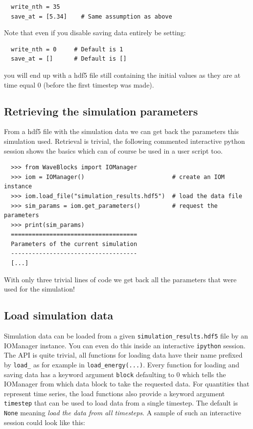 \documentclass[a4paper,10pt]{report}
\begin{document}
\begin{verbatim}
  write_nth = 35
  save_at = [5.34]    # Same assumption as above
\end{verbatim}

Note that even if you disable saving data entirely be setting:

\begin{verbatim}
  write_nth = 0     # Default is 1
  save_at = []      # Default is []
\end{verbatim}

you will end up with a hdf5 file still containing the initial values as they
are at time equal 0 (before the first timestep was made).

\subsection{Retrieving the simulation parameters}

From a hdf5 file with the simulation data we can get back the parameters this
simulation used. Retrieval is trivial, the following commented interactive python
session shows the basics which can of course be used in a user script too.

\begin{verbatim}
  >>> from WaveBlocks import IOManager
  >>> iom = IOManager()                         # create an IOM instance
  >>> iom.load_file("simulation_results.hdf5")  # load the data file
  >>> sim_params = iom.get_parameters()         # request the parameters
  >>> print(sim_params)
  ====================================
  Parameters of the current simulation
  ------------------------------------
  [...]
\end{verbatim}

With only three trivial lines of code we get back all the parameters
that were used for the simulation!

\subsection{Load simulation data}

Simulation data can be loaded from a given \verb|simulation_results.hdf5| file by
an IOManager instance. You can even do this inside an interactive \texttt{ipython}
session. The API is quite trivial, all functions for loading data have their name
prefixed by \verb|load_| as for example in \verb|load_energy(...)|. Every function
for loading and saving data has a keyword argument \texttt{block} defaulting to 0
which tells the IOManager from which data block to take the requested data.
For quantities that represent time series, the load functions also provide a keyword
argument \texttt{timestep} that can be used to load data from a single timestep.
The default is \texttt{None} meaning \emph{load the data from all timesteps}.
A sample of such an interactive session could look like this:
\end{document}

